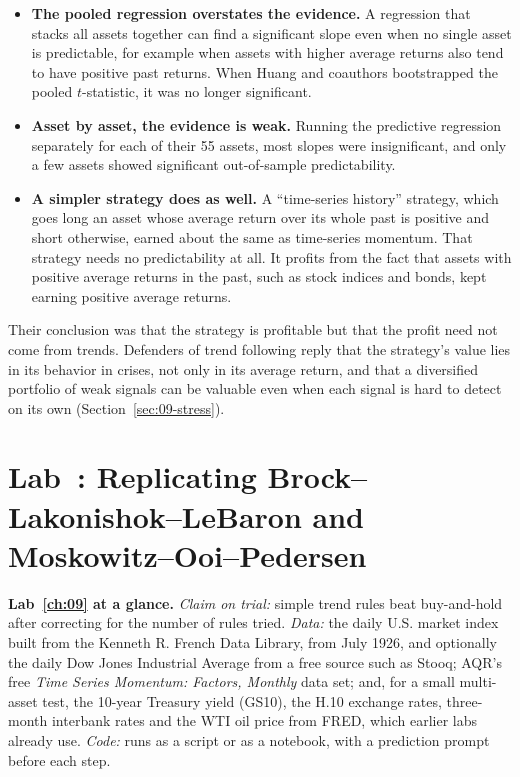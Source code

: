 \begin{itemize}
  \item \textbf{The pooled regression overstates the evidence.} A regression that stacks all assets together can find a significant slope even when no single asset is predictable, for example when assets with higher average returns also tend to have positive past returns. When Huang and coauthors bootstrapped the pooled $t$-statistic, it was no longer significant.
  \item \textbf{Asset by asset, the evidence is weak.} Running the predictive regression separately for each of their 55 assets, most slopes were insignificant, and only a few assets showed significant out-of-sample predictability.
  \item \textbf{A simpler strategy does as well.} A ``time-series history'' strategy, which goes long an asset whose average return over its whole past is positive and short otherwise, earned about the same as time-series momentum. That strategy needs no predictability at all. It profits from the fact that assets with positive average returns in the past, such as stock indices and bonds, kept earning positive average returns.
\end{itemize}

Their conclusion was that the strategy is profitable but that the profit need not come from trends. Defenders of trend following reply that the strategy's value lies in its behavior in crises, not only in its average return, and that a diversified portfolio of weak signals can be valuable even when each signal is hard to detect on its own (Section~\ref{sec:09-stress}).

\section{Lab~\thechapter: Replicating Brock--Lakonishok--LeBaron and Moskowitz--Ooi--Pedersen}
\label{sec:09-lab}

\begin{callout}
\textbf{Lab~\ref{ch:09} at a glance.} \emph{Claim on trial:} simple trend rules beat buy-and-hold after correcting for the number of rules tried. \emph{Data:} the daily U.S. market index built from the Kenneth R. French Data Library, from July 1926, and optionally the daily Dow Jones Industrial Average from a free source such as Stooq; AQR's free \emph{Time Series Momentum: Factors, Monthly} data set; and, for a small multi-asset test, the 10-year Treasury yield (GS10), the H.10 exchange rates, three-month interbank rates and the WTI oil price from FRED, which earlier labs already use. \emph{Code:} runs as a script or as a notebook, with a prediction prompt before each step.
\end{callout}

